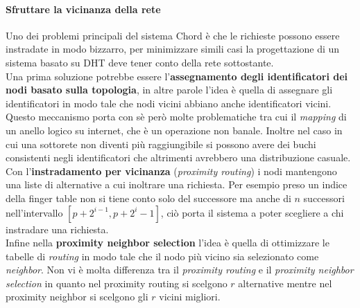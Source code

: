 \paragraph{Sfruttare la vicinanza della rete}
Uno dei problemi principali del sistema Chord è che le richieste possono essere instradate in modo bizzarro, per minimizzare simili casi la progettazione di un sistema basato su DHT deve tener conto della rete sottostante.\\
Una prima soluzione potrebbe essere l'\textbf{assegnamento degli identificatori dei nodi basato sulla topologia}, in altre parole l'idea è quella di assegnare gli identificatori in modo tale che nodi vicini abbiano anche identificatori vicini. Questo meccanismo porta con sè però molte problematiche tra cui il \emph{mapping} di un anello logico su internet, che è un operazione non banale. Inoltre nel caso in cui una sottorete non diventi più raggiungibile si possono avere dei buchi consistenti negli identificatori che altrimenti avrebbero una distribuzione casuale.\\
Con l'\textbf{instradamento per vicinanza} (\emph{proximity routing}) i nodi mantengono una liste di alternative a cui inoltrare una richiesta. Per esempio preso un indice della finger table non si tiene conto solo del successore ma anche di $n$ successori nell'intervallo $[p+2^{i-1},p+2^i-1]$, ciò porta il sistema a poter scegliere a chi instradare una richiesta.\\
Infine nella \textbf{proximity neighbor selection} l'idea è quella di ottimizzare le tabelle di \emph{routing} in modo tale che il nodo più vicino sia selezionato come \emph{neighbor}. Non vi è molta differenza tra il \emph{proximity routing} e il \emph{proximity neighbor selection} in quanto nel proximity routing si scelgono $r$ alternative mentre nel proximity neighbor si scelgono gli $r$ vicini migliori.
